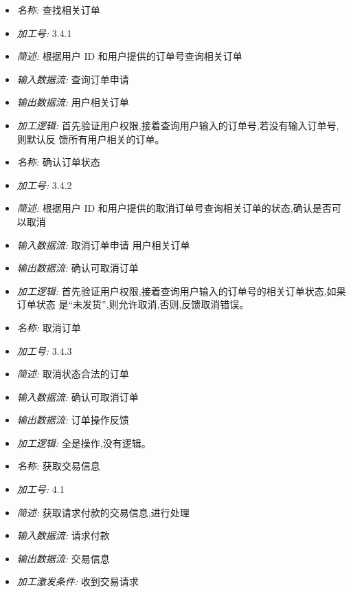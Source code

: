 \documentclass{article}
\begin{document}
\begin{CJK*}{UTF8}{gbsn}
\begin{itemize}
\item \textit{名称: }查找相关订单
\item \textit{加工号: }3.4.1
\item \textit{简述: }根据用户 ID 和用户提供的订单号查询相关订单
\item \textit{输入数据流: }查询订单申请
\item \textit{输出数据流: }用户相关订单 
\item \textit{加工逻辑: }首先验证用户权限,接着查询用户输入的订单号,若没有输入订单号,则默认反 馈所有用户相关的订单。

\end{itemize}


\vspace{-1mm}


\begin{itemize}
\item \textit{名称: }确认订单状态
\item \textit{加工号: }3.4.2
\item \textit{简述: }根据用户 ID 和用户提供的取消订单号查询相关订单的状态,确认是否可以取消 
\item \textit{输入数据流: }取消订单申请 用户相关订单
\item \textit{输出数据流: }确认可取消订单 
\item \textit{加工逻辑: }首先验证用户权限,接着查询用户输入的订单号的相关订单状态,如果订单状态 是“未发货”,则允许取消,否则,反馈取消错误。

\end{itemize}


\vspace{-1mm}


\begin{itemize}
\item \textit{名称: }取消订单
\item \textit{加工号: }3.4.3 
\item \textit{简述: }取消状态合法的订单 
\item \textit{输入数据流: }确认可取消订单 
\item \textit{输出数据流: }订单操作反馈 
\item \textit{加工逻辑: }全是操作,没有逻辑。

\end{itemize}


\vspace{-1mm}


\begin{itemize}
\item \textit{名称: } 获取交易信息
\item \textit{加工号: } 4.1
\item \textit{简述: } 获取请求付款的交易信息,进行处理 
\item \textit{输入数据流: } 请求付款
\item \textit{输出数据流: } 交易信息
\item \textit{加工激发条件: } 收到交易请求


\end{itemize}
\end{CJK*}
\end{document}

